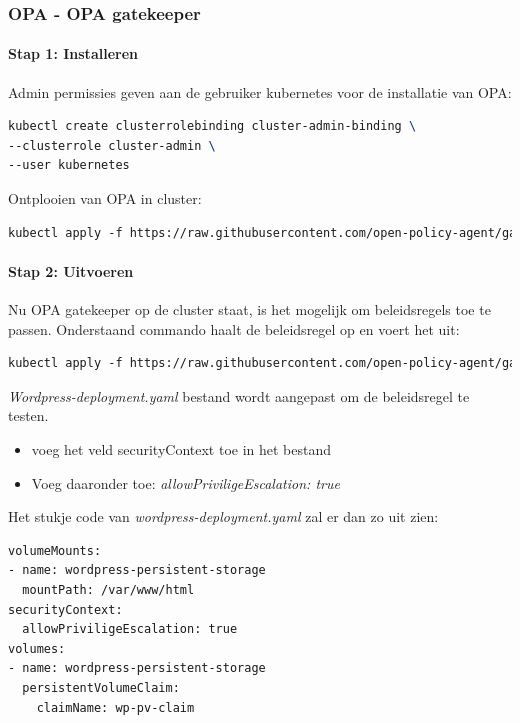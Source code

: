 \subsubsection{OPA - OPA gatekeeper}

\paragraph{Stap 1: Installeren}
Admin permissies geven aan de gebruiker kubernetes voor de installatie van OPA:
\begin{lstlisting}[language=tex, caption={Installatie OPA}]
  kubectl create clusterrolebinding cluster-admin-binding \
--clusterrole cluster-admin \
--user kubernetes
\end{lstlisting}

Ontplooien van OPA in cluster:
\begin{lstlisting}[language=tex, caption={OPA ontplooien in cluster}]
kubectl apply -f https://raw.githubusercontent.com/open-policy-agent/gatekeeper/master/deploy/gatekeeper.yaml
\end{lstlisting}

\paragraph{Stap 2: Uitvoeren}

Nu OPA gatekeeper op de cluster staat, is het mogelijk om beleidsregels toe te passen. Onderstaand commando haalt de beleidsregel op en voert het uit:
\begin{lstlisting}[language=tex, caption={Beleidsregels OPA ophalen}]
kubectl apply -f https://raw.githubusercontent.com/open-policy-agent/gatekeeper-library/master/library/pod-security-policy/allow-privilege-escalation/template.yaml
\end{lstlisting}

\textit{Wordpress-deployment.yaml} bestand wordt aangepast om de beleidsregel te testen.
\begin{itemize}
    \item voeg het veld securityContext toe in het bestand
    \item Voeg daaronder toe: \textit{allowPriviligeEscalation: true}
\end{itemize}

Het stukje code van \textit{wordpress-deployment.yaml} zal er dan zo uit zien:
\begin{lstlisting}[language=tex, caption={Stukje van \textit{wordpress-deployment.yaml} met securityContext}]
volumeMounts:
- name: wordpress-persistent-storage
  mountPath: /var/www/html
securityContext:
  allowPriviligeEscalation: true
volumes:
- name: wordpress-persistent-storage
  persistentVolumeClaim:
    claimName: wp-pv-claim
\end{lstlisting}

